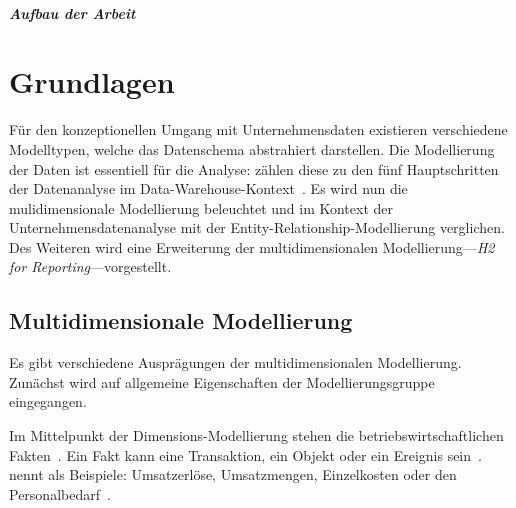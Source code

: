 \documentclass[
  language=german, %
  type=bachelor%
]{isthesis}
\begin{document}
\begin{content}
  \paragraph{Aufbau der Arbeit}




  \chapter{Grundlagen}
  


  Für den konzeptionellen Umgang mit Unternehmensdaten existieren verschiedene
  Modelltypen, welche das Datenschema abstrahiert darstellen.
  Die Modellierung der Daten ist essentiell für die Analyse:
  \textsc{\citeauthor{phipps2002automating}} zählen diese
  zu den fünf Hauptschritten der Datenanalyse im
  Data-Warehouse-Kontext~\cite[][S. 1]{phipps2002automating}. Es wird nun
  die mulidimensionale Modellierung beleuchtet und im Kontext der Unternehmensdatenanalyse
  mit der Entity-Relationship-Modellierung verglichen. Des Weiteren wird
  eine Erweiterung der multidimensionalen Modellierung---\textit{H2 for
  Reporting}---vorgestellt.



  \section{Multidimensionale Modellierung}
  Es gibt verschiedene Ausprägungen der multidimensionalen Modellierung.
  Zunächst wird auf allgemeine Eigenschaften der Modellierungsgruppe eingegangen.

  Im Mittelpunkt der Dimensions-Modellierung stehen die
  betriebswirtschaftlichen Fakten~\cite[][S.  2]{phipps2002automating}. Ein
  Fakt kann eine Transaktion, ein Objekt oder ein Ereignis sein~\cite[][S.
  42]{ballard1998data}. \textsc{\citeauthor{Kemper2010}} nennt als Beispiele:
  \glqq{}Umsatzerlöse, Umsatzmengen, Einzelkosten oder den
  Personalbedarf\grqq{}~\cite[][S. 66]{Kemper2010}. 
  

\end{content}
\end{document}
